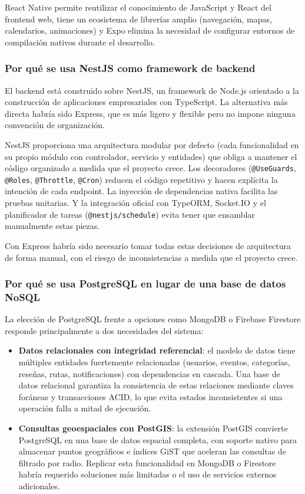 React Native permite reutilizar el conocimiento de JavaScript y React del frontend web, tiene un ecosistema de librerías amplio (navegación, mapas, calendarios, animaciones) y Expo elimina la necesidad de configurar entornos de compilación nativos durante el desarrollo.

\subsubsection{Por qué se usa NestJS como framework de backend}

El backend está construido sobre NestJS, un framework de Node.js orientado a la construcción de aplicaciones empresariales con TypeScript. La alternativa más directa habría sido Express, que es más ligero y flexible pero no impone ninguna convención de organización.

NestJS proporciona una arquitectura modular por defecto (cada funcionalidad en su propio módulo con controlador, servicio y entidades) que obliga a mantener el código organizado a medida que el proyecto crece. Los decoradores (\texttt{@UseGuards}, \texttt{@Roles}, \texttt{@Throttle}, \texttt{@Cron}) reducen el código repetitivo y hacen explícita la intención de cada endpoint. La inyección de dependencias nativa facilita las pruebas unitarias. Y la integración oficial con TypeORM, Socket.IO y el planificador de tareas (\texttt{@nestjs/schedule}) evita tener que ensamblar manualmente estas piezas.

Con Express habría sido necesario tomar todas estas decisiones de arquitectura de forma manual, con el riesgo de inconsistencias a medida que el proyecto crece.

\subsubsection{Por qué se usa PostgreSQL en lugar de una base de datos NoSQL}

La elección de PostgreSQL frente a opciones como MongoDB o Firebase Firestore responde principalmente a dos necesidades del sistema:

\begin{itemize}
    \item \textbf{Datos relacionales con integridad referencial}: el modelo de datos tiene múltiples entidades fuertemente relacionadas (usuarios, eventos, categorías, reseñas, rutas, notificaciones) con dependencias en cascada. Una base de datos relacional garantiza la consistencia de estas relaciones mediante claves foráneas y transacciones ACID, lo que evita estados inconsistentes si una operación falla a mitad de ejecución.
    \item \textbf{Consultas geoespaciales con PostGIS}: la extensión PostGIS convierte PostgreSQL en una base de datos espacial completa, con soporte nativo para almacenar puntos geográficos e índices GiST que aceleran las consultas de filtrado por radio. Replicar esta funcionalidad en MongoDB o Firestore habría requerido soluciones más limitadas o el uso de servicios externos adicionales.
\end{itemize}

